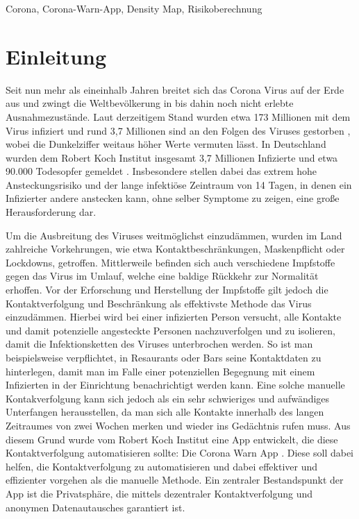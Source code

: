 \documentclass[conference,compsoc]{IEEEtran}
\begin{document}
\begin{IEEEkeywords}
Corona, Corona-Warn-App, Density Map, Risikoberechnung
\end{IEEEkeywords}

\section{Einleitung} \label{Einleitung}
Seit nun mehr als eineinhalb Jahren breitet sich das Corona Virus auf der Erde aus und zwingt die Weltbevölkerung in bis dahin noch nicht erlebte Ausnahmezustände.
Laut derzeitigem Stand wurden etwa 173 Millionen mit dem Virus infiziert und rund 3,7 Millionen sind an den Folgen des Viruses gestorben \cite{CoronaZahlenWorld}, wobei die Dunkelziffer weitaus höher Werte vermuten lässt. 
In Deutschland wurden dem Robert Koch Institut insgesamt 3,7 Millionen Infizierte und etwa 90.000 Todesopfer gemeldet \cite{CoronaZahlenDe}. 
Insbesondere stellen dabei das extrem hohe Ansteckungsrisiko und der lange infektiöse Zeintraum von 14 Tagen, in denen ein Infizierter andere anstecken kann, ohne selber Symptome zu zeigen, eine große Herausforderung dar.

Um die Ausbreitung des Viruses weitmöglichst einzudämmen, wurden im Land zahlreiche Vorkehrungen, wie etwa Kontaktbeschränkungen, Maskenpflicht oder Lockdowns, getroffen. 
Mittlerweile befinden sich auch verschiedene Impfstoffe gegen das Virus im Umlauf, welche eine baldige Rückkehr zur Normalität erhoffen.
Vor der Erforschung und Herstellung der Impfstoffe gilt jedoch die Kontaktverfolgung und Beschränkung als effektivste Methode das Virus einzudämmen. 
Hierbei wird bei einer infizierten Person versucht, alle Kontakte und damit potenzielle angesteckte Personen nachzuverfolgen und zu isolieren, damit die Infektionsketten des Viruses unterbrochen werden.
So ist man beispielsweise verpflichtet, in Resaurants oder Bars seine Kontaktdaten zu hinterlegen, damit man im Falle einer potenziellen Begegnung mit einem Infizierten in der Einrichtung benachrichtigt werden kann.
Eine solche manuelle Kontakverfolgung kann sich jedoch als ein sehr schwieriges und aufwändiges Unterfangen herausstellen, da man sich alle Kontakte innerhalb des langen Zeitraumes von zwei Wochen merken und wieder ins Gedächtnis rufen muss.
Aus diesem Grund wurde vom Robert Koch Institut eine App entwickelt, die diese Kontaktverfolgung automatisieren sollte: Die Corona Warn App \cite{CWA}. 
Diese soll dabei helfen, die Kontaktverfolgung zu automatisieren und dabei effektiver und effizienter vorgehen als die manuelle Methode.
Ein zentraler Bestandspunkt der App ist die Privatsphäre, die mittels dezentraler Kontaktverfolgung und anonymen Datenautausches garantiert ist.
\end{document}
